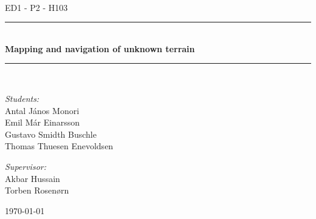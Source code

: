 \newcommand{\HRule}{\rule{\linewidth}{0.5 mm}}
\begin{titlepage}

\begin{center}
\\[0.5cm]

\textsc{\Large ED1 - P2 - H103}\\[0.6cm]

\HRule \\[0.9cm]
{ \Huge \bfseries Mapping and navigation of unknown terrain }\\[0.4cm]

\HRule \\[0.5cm]


\begin{minipage}{0.49\textwidth}
\begin{flushleft} \large
\emph{Students:}\\
Antal János Monori\\
Emil Már Einarsson\\
Gustavo Smidth Buschle\\
Thomas Thuesen Enevoldsen
\end{flushleft}
\end{minipage}
\begin{minipage}{0.49\textwidth}
\begin{flushright} \large
\emph{Supervisor:} \\
Akbar Hussain\\
Torben Rosenørn
\end{flushright}
\end{minipage}

\vfill

{\large \today}



\end{center}

\end{titlepage}